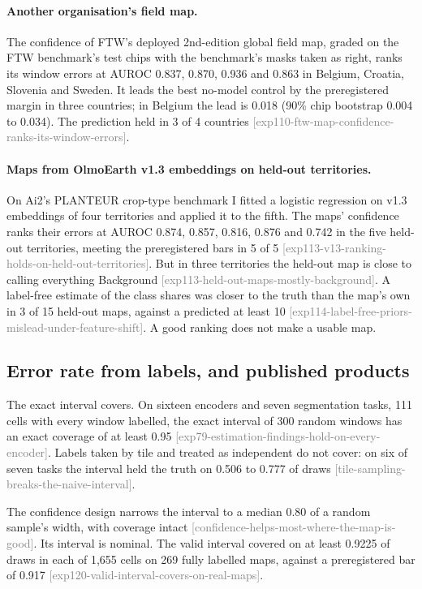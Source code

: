 \documentclass[11pt,a4paper]{article}
\newcommand{\claim}[1]{{\scriptsize\textsf{\textcolor{gray}{[#1]}}}}
\begin{document}
\paragraph{Another organisation's field map.}
\label{sec:res-ftw}
The confidence of FTW's deployed 2nd-edition global field map, graded on the FTW benchmark's test chips with the
benchmark's masks taken as right, ranks its window errors at AUROC 0.837, 0.870, 0.936 and 0.863 in Belgium, Croatia,
Slovenia and Sweden. It leads the best no-model control by the preregistered margin in three countries; in Belgium
the lead is 0.018 (90\% chip bootstrap 0.004 to 0.034). The prediction held in 3 of 4 countries
\claim{exp110-ftw-map-confidence-ranks-its-window-errors}.

\paragraph{Maps from OlmoEarth v1.3 embeddings on held-out territories.}
\label{sec:res-planteur}
On Ai2's PLANTEUR crop-type benchmark I fitted a logistic regression on v1.3 embeddings of four territories and
applied it to the fifth. The maps' confidence ranks their errors at AUROC 0.874, 0.857, 0.816, 0.876 and 0.742 in the
five held-out territories, meeting the preregistered bars in 5 of 5
\claim{exp113-v13-ranking-holds-on-held-out-territories}. But in three territories the held-out map is close to
calling everything Background \claim{exp113-held-out-maps-mostly-background}. A label-free estimate of the class
shares was closer to the truth than the map's own in 3 of 15 held-out maps, against a predicted at least 10
\claim{exp114-label-free-priors-mislead-under-feature-shift}. A good ranking does not make a usable map.

\subsection{Error rate from labels, and published products}
\label{sec:res-estimate}


The exact interval covers. On sixteen encoders and seven segmentation tasks, 111 cells with every window labelled,
the exact interval of 300 random windows has an exact coverage of at least 0.95
\claim{exp79-estimation-findings-hold-on-every-encoder}. Labels taken by tile and treated as independent do not
cover: on six of seven tasks the interval held the truth on 0.506 to 0.777 of draws
\claim{tile-sampling-breaks-the-naive-interval}.

The confidence design \citep{kumar2016} narrows the interval to a median 0.80 of a random sample's width, with
coverage intact \claim{confidence-helps-most-where-the-map-is-good}. Its interval is nominal. The valid interval
covered on at least 0.9225 of draws in each of 1,655 cells on 269 fully labelled maps, against a preregistered bar
of 0.917 \claim{exp120-valid-interval-covers-on-real-maps}.
\end{document}
